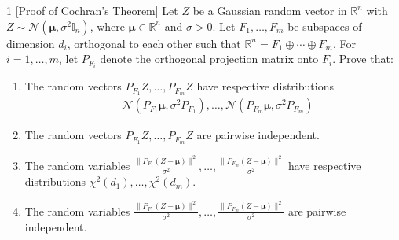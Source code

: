 \begin{exercisebox}{1 [Proof of Cochran's Theorem]}
    Let $Z$ be a Gaussian random vector in $\mathbb{R}^n$ with $Z \sim \mathcal{N}(\boldsymbol{\mu}, \sigma^2\mathbb{I}_n)$, 
    where $\boldsymbol{\mu} \in \mathbb{R}^n$ and $\sigma > 0$. Let $F_1,\ldots,F_m$ be subspaces of dimension $d_i$, 
    orthogonal to each other such that $\mathbb{R}^n = F_1 \oplus \cdots \oplus F_m$. For $i=1,\ldots,m$, let $P_{F_i}$ denote the orthogonal projection matrix onto $F_i$. Prove that:

    \begin{enumerate}
        \item The random vectors $P_{F_1}Z,\ldots,P_{F_m}Z$ have respective distributions 
            \begin{align*}
                &\mathcal{N}(P_{F_1}\boldsymbol{\mu},\sigma^2P_{F_1}),\ldots,\mathcal{N}(P_{F_m}\boldsymbol{\mu},\sigma^2P_{F_m})
            \end{align*}
        
        \item The random vectors $P_{F_1}Z,\ldots,P_{F_m}Z$ are pairwise independent.
        
        \item The random variables $\frac{\|P_{F_1}(Z-\boldsymbol{\mu})\|^2}{\sigma^2},\ldots,\frac{\|P_{F_m}(Z-\boldsymbol{\mu})\|^2}{\sigma^2}$ have respective distributions $\chi^2(d_1),\ldots,\chi^2(d_m)$.
        
        \item The random variables $\frac{\|P_{F_1}(Z-\boldsymbol{\mu})\|^2}{\sigma^2},\ldots,\frac{\|P_{F_m}(Z-\boldsymbol{\mu})\|^2}{\sigma^2}$ are pairwise independent.
    \end{enumerate}
\end{exercisebox}

